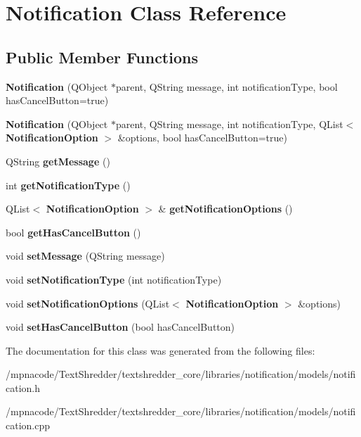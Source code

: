 \section{Notification Class Reference}
\label{class_notification}
\subsection*{Public Member Functions}
\begin{DoxyCompactItemize}
\item 
{\bfseries Notification} (QObject $\ast$parent, QString message, int notificationType, bool hasCancelButton=true)\label{class_notification_a2b79001967f10e6a573427b72e93d88f}

\item 
{\bfseries Notification} (QObject $\ast$parent, QString message, int notificationType, QList$<$ {\bf NotificationOption} $>$ \&options, bool hasCancelButton=true)\label{class_notification_a50c872b05a1c6b70c963143f3c526605}

\item 
QString {\bfseries getMessage} ()\label{class_notification_a8572346b3b6864c798d0c88c84a9488f}

\item 
int {\bfseries getNotificationType} ()\label{class_notification_a01d1f04d52cb0b0849ad2f6fa2b398e0}

\item 
QList$<$ {\bf NotificationOption} $>$ \& {\bfseries getNotificationOptions} ()\label{class_notification_ae4e6c584005a90ec5c7a44b61a8f8811}

\item 
bool {\bfseries getHasCancelButton} ()\label{class_notification_ade29a0210eeebe611d28fbe07fbd64f7}

\item 
void {\bfseries setMessage} (QString message)\label{class_notification_af1544d2ee3237b16863b777f2f119432}

\item 
void {\bfseries setNotificationType} (int notificationType)\label{class_notification_aa22b660eeda29be0159c146c70d949bc}

\item 
void {\bfseries setNotificationOptions} (QList$<$ {\bf NotificationOption} $>$ \&options)\label{class_notification_a5f738c68e1af9cf2dfbe0784792911ba}

\item 
void {\bfseries setHasCancelButton} (bool hasCancelButton)\label{class_notification_a8443cb2c8a05d93303cef75145352b4d}

\end{DoxyCompactItemize}


The documentation for this class was generated from the following files:\begin{DoxyCompactItemize}
\item 
/mpnacode/TextShredder/textshredder\_\-core/libraries/notification/models/notification.h\item 
/mpnacode/TextShredder/textshredder\_\-core/libraries/notification/models/notification.cpp\end{DoxyCompactItemize}
